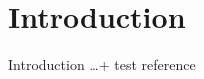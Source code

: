 \setchapterpreamble[u]{\margintoc}

\chapter{Introduction}

Introduction \dots + test reference \cite{IceCube:2011ucd}

